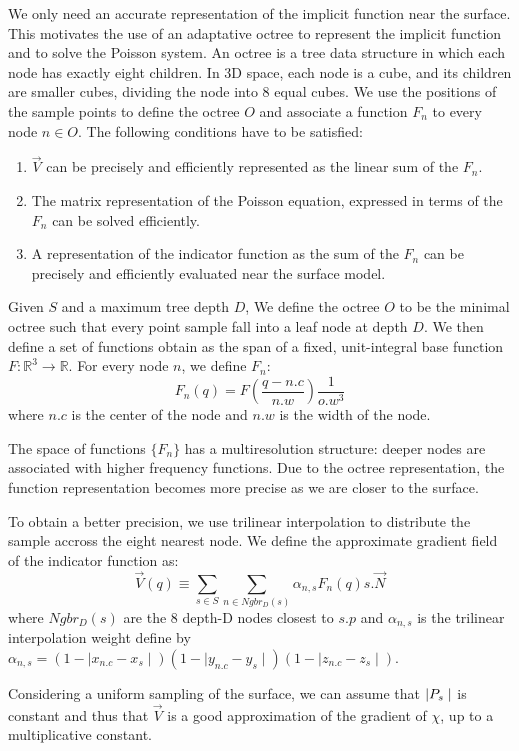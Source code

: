 \documentclass[a4paper]{article}
\begin{document}
We only need an accurate representation of the implicit function near the surface. This motivates the use of an adaptative octree to represent the implicit function and to solve the Poisson system. An octree is a tree data structure in which each node has exactly eight children. In 3D space, each node is a cube, and its children are smaller cubes, dividing the node into 8 equal cubes. We use the positions of the sample points to define the octree $O$ and associate a function $F_n$ to every node $n \in O$. The following conditions have to be satisfied:
\begin{enumerate}
\item $\vec{V}$ can be precisely and efficiently represented as the linear sum of the $F_n$.
\item The matrix representation of the Poisson equation, expressed in terms of the $F_n$ can be solved efficiently.
\item A representation of the indicator function as the sum of the $F_n$ can be precisely and efficiently evaluated near the surface model.
\end{enumerate}

Given $S$ and a maximum tree depth $D$, We define the octree $O$ to be the minimal octree such that every point sample fall into a leaf node at depth $D$. We then define a set of functions obtain as the span of a fixed, unit-integral base function $F: \mathbb{R}^3 \to \mathbb{R}$. For every node $n$, we define $F_n$:
$$F_n(q) = F(\frac{q - n.c}{n.w})\frac{1}{o.w^3}$$
where $n.c$ is the center of the node and $n.w$ is the width of the node.

The space of functions $\{F_n\}$ has a multiresolution structure: deeper nodes are associated with higher frequency functions. Due to the octree representation, the function representation becomes more precise as we are closer to the surface.


To obtain a better precision, we use trilinear interpolation to distribute the sample accross the eight nearest node. We define the approximate gradient field of the indicator function as:
$$\vec{V}(q) \equiv \sum_{s \in S} \sum_{n \in Ngbr_D(s)} \alpha_{n,s}F_n(q)s.\vec{N}$$
where $Ngbr_D(s)$ are the 8 depth-D nodes closest to $s.p$ and $\alpha_{n,s}$ is the trilinear interpolation weight define by $\alpha_{n,s} = (1 - \mid{}x_{n.c} - x_s \mid)(1 - \mid y_{n.c} - y_s\mid)(1 - \mid z_{n.c} - z_s\mid)$.

Considering a uniform sampling of the surface, we can assume that $\\|P_s\mid$ is constant and thus that $\vec{V}$ is a good approximation of the gradient of $\chi$, up to a multiplicative constant.
\end{document}
